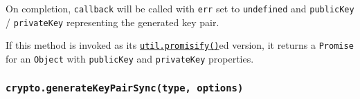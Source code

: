 \begin{Shaded}
\begin{Highlighting}[]
\NormalTok{ \{}
\OperatorTok{,}
\NormalTok{\} }\OperatorTok{=} \NormalTok{(}\NormalTok{)}\OperatorTok{;}

\NormalTok{(}\OperatorTok{,}\NormalTok{ \{}
  \OperatorTok{:} \OperatorTok{,}
  \OperatorTok{:}\NormalTok{ \{}
    \OperatorTok{:} \OperatorTok{,}
    \OperatorTok{:} \OperatorTok{,}
\NormalTok{  \}}\OperatorTok{,}
  \OperatorTok{:}\NormalTok{ \{}
    \OperatorTok{:} \OperatorTok{,}
    \OperatorTok{:} \OperatorTok{,}
    \OperatorTok{:} \OperatorTok{,}
    \OperatorTok{:} \OperatorTok{,}
\NormalTok{  \}}\OperatorTok{,}
\NormalTok{\}}\OperatorTok{,}\OperatorTok{,}\OperatorTok{,}\KeywordTok{=\textgreater{}}\NormalTok{ \{}
\NormalTok{\})}\OperatorTok{;}
\end{Highlighting}
\end{Shaded}

On completion, \texttt{callback} will be called with \texttt{err} set to
\texttt{undefined} and \texttt{publicKey} / \texttt{privateKey}
representing the generated key pair.

If this method is invoked as its
\href{util.md\#utilpromisifyoriginal}{\texttt{util.promisify()}}ed
version, it returns a \texttt{Promise} for an \texttt{Object} with
\texttt{publicKey} and \texttt{privateKey} properties.

\subsubsection{\texorpdfstring{\texttt{crypto.generateKeyPairSync(type,\ options)}}{crypto.generateKeyPairSync(type, options)}}\label{crypto.generatekeypairsynctype-options}

